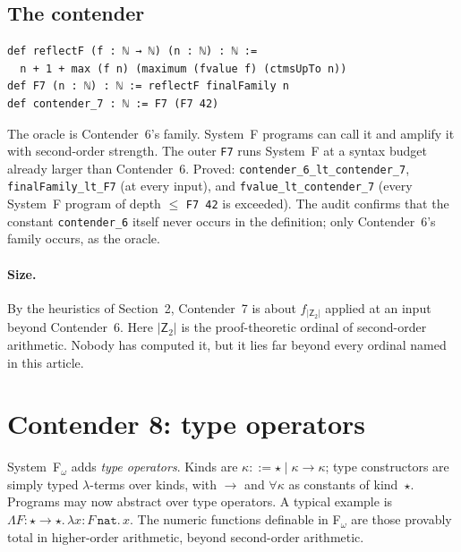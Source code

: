 \documentclass[11pt]{article}
\theoremstyle{definition}
\theoremstyle{remark}
\newcommand{\lean}[1]{\texttt{#1}}
\begin{document}
\subsection{The contender}
\begin{lstlisting}
def reflectF (f : ℕ → ℕ) (n : ℕ) : ℕ :=
  n + 1 + max (f n) (maximum (fvalue f) (ctmsUpTo n))
def F7 (n : ℕ) : ℕ := reflectF finalFamily n
def contender_7 : ℕ := F7 (F7 42)
\end{lstlisting}
The oracle is Contender~6's family. System~F programs can call it and amplify it
with second-order strength. The outer \lean{F7} runs System~F at a syntax budget
already larger than Contender~6. Proved:
\lean{contender\_6\_lt\_contender\_7}, \lean{finalFamily\_lt\_F7} (at every
input), and \lean{fvalue\_lt\_contender\_7} (every System~F program of depth
$\le$ \lean{F7 42} is exceeded). The audit confirms that the constant
\lean{contender\_6} itself never occurs in the definition; only Contender~6's
family occurs, as the oracle.

\paragraph{Size.} By the heuristics of Section~2, Contender~7 is about
$f_{|\mathsf{Z}_2|}$ applied at an input beyond Contender~6. Here
$|\mathsf{Z}_2|$ is the proof-theoretic ordinal of second-order arithmetic.
Nobody has computed it, but it lies far beyond every ordinal named in this
article.

\section{Contender 8: type operators}

System~F$_\omega$ adds \emph{type operators}. Kinds are
$\kappa::=\star\mid\kappa\to\kappa$; type constructors are simply typed
$\lambda$-terms over kinds, with $\to$ and $\forall\kappa$ as constants of
kind~$\star$. Programs may now abstract over type operators. A typical example
is $\Lambda F{:}\star\to\star.\,\lambda x{:}F\,\mathtt{nat}.\,x$. The numeric
functions definable in F$_\omega$ are those provably total in higher-order
arithmetic, beyond second-order arithmetic.
\end{document}
